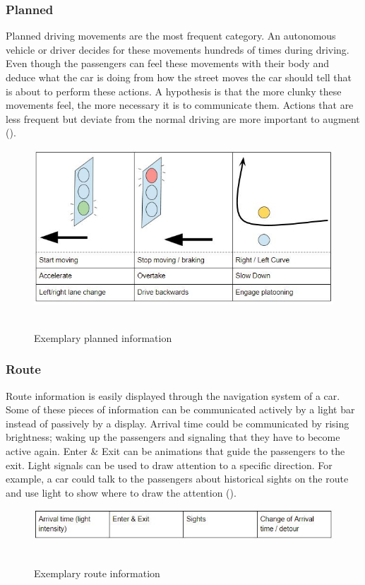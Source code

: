 \subsubsection{Planned}
Planned driving movements are the most frequent category. An autonomous vehicle or driver decides for these movements hundreds of times during driving. Even though the passengers can feel these movements with their body and deduce what the car is doing from how the street moves the car should tell that is about to perform these actions. A hypothesis is that the more clunky these movements feel, the more necessary it is to communicate them. Actions that are less frequent but deviate from the normal driving are more important to augment (). 
\begin{figure}
    \includegraphics[width=1\textwidth]{fig/planned.JPG}\hfill\
    \caption[Planned information]{Exemplary planned information}
    \label{fig:planned}
\end{figure}

\subsubsection{Route}
Route information is easily displayed through the navigation system of a car. Some of these pieces of information can be communicated actively by a light bar instead of passively by a display. Arrival time could be communicated by rising brightness; waking up the passengers and signaling that they have to become active again. Enter \& Exit can be animations that guide the passengers to the exit. Light signals can be used to draw attention to a specific direction. For example, a car could talk to the passengers about historical sights on the route and use light to show where to draw the attention (). 
\begin{figure}
    \includegraphics[width=1\textwidth]{fig/route.JPG}\hfill\
    \caption[Route information]{Exemplary route information}
    \label{fig:route}
\end{figure}

